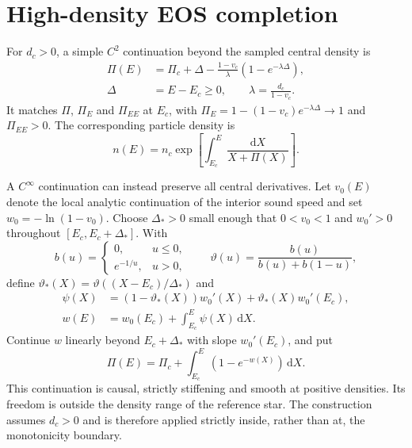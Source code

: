 \documentclass[journal,a4paper]{IEEEtran}
\newcommand{\dd}{\mathrm d}
\begin{document}
\section{High-density EOS completion}
\label{app:completion}
For $d_c>0$, a simple $C^2$ continuation beyond the sampled central density is
\begin{align}
 \Pi(E)&=\Pi_c+\Delta-\frac{1-v_c}{\lambda}
                    (1-e^{-\lambda\Delta}),\nonumber\\
 \Delta&=E-E_c\ge0,\qquad \lambda=\frac{d_c}{1-v_c}.
 \label{eq:completion}
\end{align}
It matches $\Pi$, $\Pi_E$ and $\Pi_{EE}$ at $E_c$, with
$\Pi_E=1-(1-v_c)e^{-\lambda\Delta}\to1$ and $\Pi_{EE}>0$.
The corresponding particle density is
\begin{equation}
 n(E)=n_c\exp\left[\int_{E_c}^{E}\frac{\dd X}{X+\Pi(X)}\right].
\end{equation}

A $C^\infty$ continuation can instead preserve all central derivatives. Let $v_0(E)$ denote the local analytic continuation of the interior sound speed and set $w_0=-\ln(1-v_0)$. Choose $\Delta_*>0$ small enough that $0<v_0<1$ and $w_0'>0$ throughout $[E_c,E_c+\Delta_*]$. With
\begin{equation}
 b(u)=\begin{cases}0,&u\le0,\\e^{-1/u},&u>0,\end{cases}
 \qquad \vartheta(u)=\frac{b(u)}{b(u)+b(1-u)},
\end{equation}
define $\vartheta_* (X)=\vartheta((X-E_c)/\Delta_*)$ and
\begin{align}
 \psi(X)&=(1-\vartheta_*(X))w_0'(X)
       +\vartheta_*(X)w_0'(E_c),\nonumber\\
 w(E)&=w_0(E_c)+\int_{E_c}^E\psi(X)\,\dd X.
\end{align}
Continue $w$ linearly beyond $E_c+\Delta_*$ with slope $w_0'(E_c)$, and put
\begin{equation}
 \Pi(E)=\Pi_c+\int_{E_c}^E(1-e^{-w(X)})\,\dd X.
\end{equation}
This continuation is causal, strictly stiffening and smooth at positive densities. Its freedom is outside the density range of the reference star. The construction assumes $d_c>0$ and is therefore applied strictly inside, rather than at, the monotonicity boundary.
\end{document}
